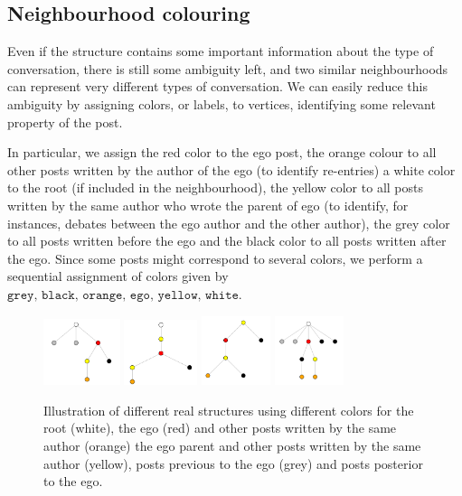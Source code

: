 \documentclass[conference]{IEEEtran}
\begin{document}
\subsection{Neighbourhood colouring}\label{sec:colouring}
Even if the structure contains some important information about the type of conversation, there is still some ambiguity left, and two similar neighbourhoods can represent very different types of conversation. We can easily reduce this ambiguity by assigning colors, or labels, to vertices, identifying some relevant property of the post. 

In particular, we assign the red color to the ego post, the orange colour to all other posts written by the author of the ego (to identify re-entries) a white color to the root (if included in the neighbourhood), the yellow color to all posts written by the same author who wrote the parent of ego (to identify, for instances, debates between the ego author and the other author), the grey color to all posts written before the ego and the black color to all posts written after the ego. Since some posts might correspond to several colors, we perform a sequential assignment of colors given by $\texttt{grey, black, orange, ego, yellow, white}$. 

\begin{figure}
\centering
\includegraphics[width=0.2\textwidth]{neighbourhood_time_342}
\includegraphics[width=0.19\textwidth]{neighbourhood_time_456}
\includegraphics[width=0.18\textwidth]{neighbourhood_time_501}
\includegraphics[width=0.18\textwidth]{neighbourhood_time_524}
\caption{Illustration of different real structures using different colors for the root (white), the ego (red) and other posts written by the same author (orange) the ego parent and other posts written by the same author (yellow), posts previous to the ego (grey) and posts posterior to the ego.}
\label{fig:colors}
\end{figure}
\end{document}
